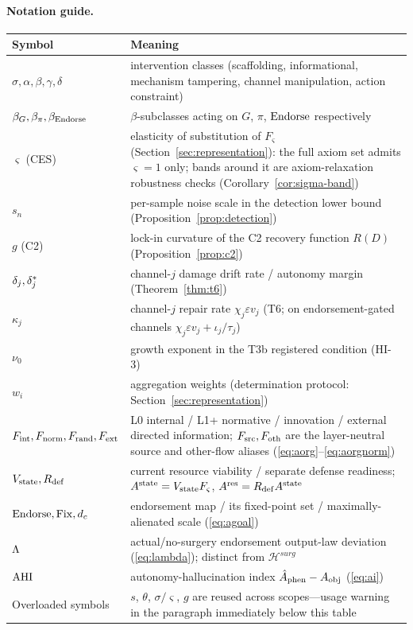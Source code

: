 \paragraph{Notation guide.}
\begin{center}\small
\begin{tabularx}{\textwidth}{@{}l >{\raggedright\arraybackslash}X@{}}
\toprule
Symbol & Meaning \\
\midrule
$\sigma,\alpha,\beta,\gamma,\delta$ & intervention classes (scaffolding,
informational, mechanism tampering, channel manipulation, action
constraint) \\
$\beta_G,\beta_\pi,\beta_{\mathrm{Endorse}}$ & $\beta$-subclasses acting on $G$,
$\pi$, $\mathrm{Endorse}$ respectively \\
$\varsigma$ (CES) & elasticity of substitution of $F_\varsigma$
(Section~\ref{sec:representation}): the full axiom set admits
$\varsigma=1$ only; bands around it are axiom-relaxation robustness checks
(Corollary~\ref{cor:sigma-band}) \\
$s_n$ & per-sample noise scale in the detection lower bound
(Proposition~\ref{prop:detection}) \\
$g$ (C2) & lock-in curvature of the C2 recovery function $R(D)$
(Proposition~\ref{prop:c2}) \\
$\delta_j,\delta^{*}_j$ & channel-$j$ damage drift rate / autonomy margin
(Theorem~\ref{thm:t6}) \\
$\kappa_j$ & channel-$j$ repair rate $\chi_j\varepsilon v_j$ (T6; on
endorsement-gated channels $\chi_j\varepsilon v_j+\iota_j/\tau_j$) \\
$\nu_0$ & growth exponent in the T3b registered condition (HI-3) \\
$w_i$ & aggregation weights (determination protocol:
Section~\ref{sec:representation}) \\
$F_{\mathrm{int}},F_{\mathrm{norm}},F_{\mathrm{rand}},F_{\mathrm{ext}}$ & L0 internal / L1+ normative / innovation /
external directed information; $F_{\mathrm{src}},F_{\mathrm{oth}}$ are the layer-neutral source and
other-flow aliases (\eqref{eq:aorg}--\eqref{eq:aorgnorm}) \\
$V_{\mathrm{state}},R_{\mathrm{def}}$ & current resource viability / separate defense readiness;
$A^{\mathrm{state}}=V_{\mathrm{state}} F_\varsigma$, $A^{\mathrm{res}}=R_{\mathrm{def}}A^{\mathrm{state}}$ \\
$\mathrm{Endorse},\mathrm{Fix},d_{c}$ & endorsement map / its fixed-point set /
maximally-alienated scale (\eqref{eq:agoal}) \\
$\Lambda$ & actual/no-surgery endorsement output-law deviation
(\eqref{eq:lambda}); distinct from $\mathcal H^{surg}$ \\
$\mathrm{AHI}$ & autonomy-hallucination index $\hat{A}_{\mathrm{phen}}-A_{\mathrm{obj}}$ (\eqref{eq:ai}) \\
Overloaded symbols & $s$, $\theta$, $\sigma/\varsigma$, $g$ are reused across
scopes---usage warning in the paragraph immediately below this table \\
\bottomrule
\end{tabularx}
\end{center}

